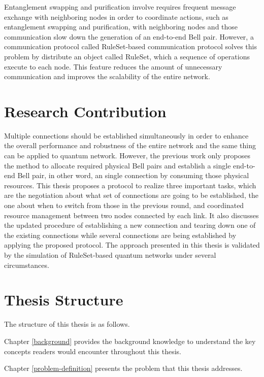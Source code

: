 Entanglement swapping and purification involve requires frequent message exchange with neighboring nodes in order to coordinate actions, such as entanglement swapping and purification, with neighboring nodes and those communication slow down the generation of an end-to-end Bell pair.
However, a communication protocol \cite{matsuo2019quantum} called RuleSet-based communication protocol solves this problem by distribute an object called RuleSet, which a sequence of operations execute to each node. This feature reduces the amount of unnecessary communication and improves the scalability of the entire network.

\section{Research Contribution}
\label{introduction:research-contribution}

Multiple connections should be established simultaneously in order to enhance the overall performance and robustness of the entire network and the same thing can be applied to quantum network. 
However, the previous work only proposes the method to allocate required physical Bell pairs and establish a single end-to-end Bell pair, in other word, an single connection by consuming those physical resources.
This thesis proposes a protocol to realize three important tasks, which are the negotiation about what set of connections are going to be established, the one about when to switch from those in the previous round, and coordinated resource management between two nodes connected by each link.
It also discusses the updated procedure of establishing a new connection and tearing down one of the existing connections while several connections are being established by applying the proposed protocol.
The approach presented in this thesis is validated by the simulation of RuleSet-based quantum networks under several circumstances.

\section{Thesis Structure}
\label{introduction:thesis-structure} 

The structure of this thesis is as follows. 

Chapter \ref{background} provides the background knowledge to understand the key concepts readers would encounter throughout this thesis.

Chapter \ref{problem-definition} presents the problem that this thesis addresses.

